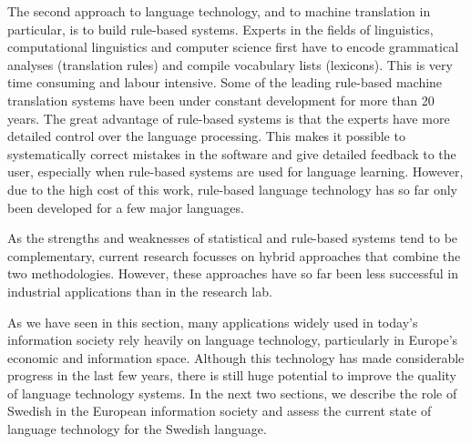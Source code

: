 \begin{multicols}{2}
The second approach to language technology, and to machine translation in particular, is to build rule-based systems. Experts in the fields of linguistics, computational linguistics and computer science first have to encode grammatical analyses (translation rules) and compile vocabulary lists (lexicons). This is very time consuming and labour intensive. Some of the leading rule-based machine translation systems have been under constant development for more than 20 years. The great advantage of rule-based systems is that the experts have more detailed control over the language processing. This makes it possible to systematically correct mistakes in the software and give detailed feedback to the user, especially when rule-based systems are used for language learning. However, due to the high cost of this work, rule-based language technology has so far only been developed for a few major languages. 

As the strengths and weaknesses of statistical and rule-based systems tend to be complementary, current research focusses on hybrid approaches that combine the two methodologies. However, these approaches have so far been less successful in industrial applications than in the research lab. 


As we have seen in this section, many applications widely used in today’s information society rely heavily on language technology, particularly in Europe’s economic and information space. Although this technology has made considerable progress in the last few years, there is still huge potential to improve the quality of language technology systems. In the next two sections, we describe the role of Swedish in the European information society and assess the current state of language technology for the Swedish language.
\end{multicols}

\clearpage


